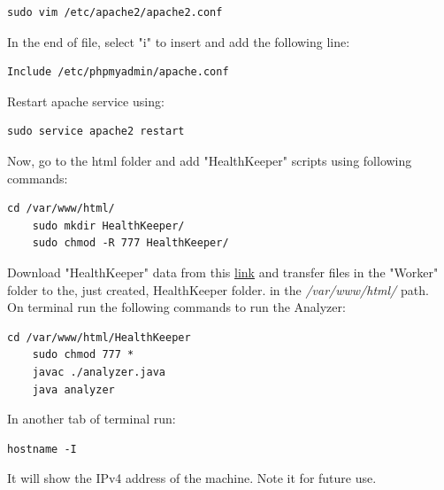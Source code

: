 \documentclass{article}
\begin{document}
\begin{lstlisting}[style=BashInputStyle]
    sudo vim /etc/apache2/apache2.conf
\end{lstlisting}
In the end of file, select "i" to insert and add the following line:
\begin{lstlisting}[style=BashInputStyle]
    Include /etc/phpmyadmin/apache.conf
\end{lstlisting}
Restart apache service using:
\begin{lstlisting}[style=BashInputStyle]
    sudo service apache2 restart
\end{lstlisting}
Now, go to the html folder and add "HealthKeeper" scripts using following commands:
\begin{lstlisting}[style=BashInputStyle]
    cd /var/www/html/
    sudo mkdir HealthKeeper/
    sudo chmod -R 777 HealthKeeper/
\end{lstlisting}
Download "HealthKeeper" data from this \href{https://drive.google.com/open?id=1DZWaJHHNMrJFnsCfxoWSIpfDhK7n-qHH}{link} and transfer files in the "Worker" folder to the, just created, HealthKeeper folder. in the \textit{/var/www/html/} path.\\
On terminal run the following commands to run the Analyzer:
\begin{lstlisting}[style=BashInputStyle]
    cd /var/www/html/HealthKeeper
    sudo chmod 777 *
    javac ./analyzer.java
    java analyzer
\end{lstlisting}
In another tab of terminal run:
\begin{lstlisting}[style=BashInputStyle]
    hostname -I
\end{lstlisting}
It will show the IPv4 address of the machine. Note it for future use.
\end{document}
